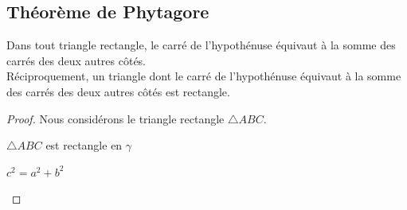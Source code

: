 \documentclass[a4paper,12pt]{article}
\begin{document}
\pagebreak
\subsection{Théorème de Phytagore}
\begin{theorem}
Dans tout triangle rectangle, le carré de l'hypothénuse équivaut à la somme des carrés des deux autres côtés.\\
Réciproquement, un triangle dont le carré de l'hypothénuse équivaut à la somme des carrés des deux autres côtés est rectangle.
\end{theorem}


\begin{proof}
Nous considérons le triangle rectangle $\triangle ABC$.

\begin{hyp}
$\triangle ABC$ est rectangle en $\gamma$
\end{hyp}

\begin{concl}
$c^2 = a^2 + b^2$
\end{concl}




\end{proof}
\end{document}

